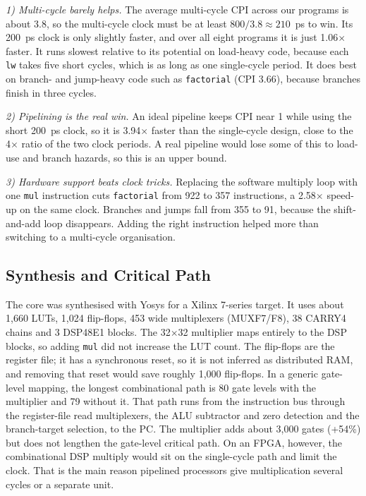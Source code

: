 \documentclass[conference]{IEEEtran}
\begin{document}
\textit{1) Multi-cycle barely helps.} The average multi-cycle CPI across our programs is about 3.8, so the multi-cycle clock must be at least $800/3.8 \approx 210$~ps to win. Its 200~ps clock is only slightly faster, and over all eight programs it is just 1.06$\times$ faster. It runs slowest relative to its potential on load-heavy code, because each \texttt{lw} takes five short cycles, which is as long as one single-cycle period. It does best on branch- and jump-heavy code such as \texttt{factorial} (CPI 3.66), because branches finish in three cycles.

\textit{2) Pipelining is the real win.} An ideal pipeline keeps CPI near 1 while using the short 200~ps clock, so it is 3.94$\times$ faster than the single-cycle design, close to the 4$\times$ ratio of the two clock periods. A real pipeline would lose some of this to load-use and branch hazards, so this is an upper bound.

\textit{3) Hardware support beats clock tricks.} Replacing the software multiply loop with one \texttt{mul} instruction cuts \texttt{factorial} from 922 to 357 instructions, a 2.58$\times$ speed-up on the same clock. Branches and jumps fall from 355 to 91, because the shift-and-add loop disappears. Adding the right instruction helped more than switching to a multi-cycle organisation.

\subsection{Synthesis and Critical Path}
The core was synthesised with Yosys for a Xilinx 7-series target. It uses about 1{,}660 LUTs, 1{,}024 flip-flops, 453 wide multiplexers (MUXF7/F8), 38 CARRY4 chains and 3 DSP48E1 blocks. The 32$\times$32 multiplier maps entirely to the DSP blocks, so adding \texttt{mul} did not increase the LUT count. The flip-flops are the register file; it has a synchronous reset, so it is not inferred as distributed RAM, and removing that reset would save roughly 1{,}000 flip-flops. In a generic gate-level mapping, the longest combinational path is 80 gate levels with the multiplier and 79 without it. That path runs from the instruction bus through the register-file read multiplexers, the ALU subtractor and zero detection and the branch-target selection, to the PC. The multiplier adds about 3{,}000 gates (+54\%) but does not lengthen the gate-level critical path. On an FPGA, however, the combinational DSP multiply would sit on the single-cycle path and limit the clock. That is the main reason pipelined processors give multiplication several cycles or a separate unit.
\end{document}
